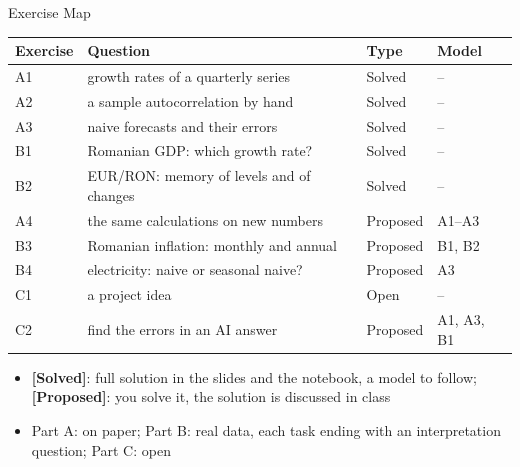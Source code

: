 \begin{frame}{Exercise Map}
\itemsize{\footnotesize}
\begin{center}
\footnotesize
\begin{tabular}{l>{\raggedright\arraybackslash}p{6.4cm}ll}
\toprule
\textbf{Exercise} & \textbf{Question} & \textbf{Type} & \textbf{Model} \\
\midrule
A1 & growth rates of a quarterly series & Solved & -- \\
A2 & a sample autocorrelation by hand & Solved & -- \\
A3 & naive forecasts and their errors & Solved & -- \\
B1 & Romanian GDP: which growth rate? & Solved & -- \\
B2 & EUR/RON: memory of levels and of changes & Solved & -- \\
A4 & the same calculations on new numbers & Proposed & A1--A3 \\
B3 & Romanian inflation: monthly and annual & Proposed & B1, B2 \\
B4 & electricity: naive or seasonal naive? & Proposed & A3 \\
C1 & a project idea & Open & -- \\
C2 & find the errors in an AI answer & Proposed & A1, A3, B1 \\
\bottomrule
\end{tabular}
\end{center}
\begin{itemize}
    \item \textbf{[Solved]}: full solution in the slides and the notebook, a model to follow; \textbf{[Proposed]}: you solve it, the solution is discussed in class
    \item Part A: on paper; Part B: real data, each task ending with an interpretation question; Part C: open
\end{itemize}
\end{frame}

